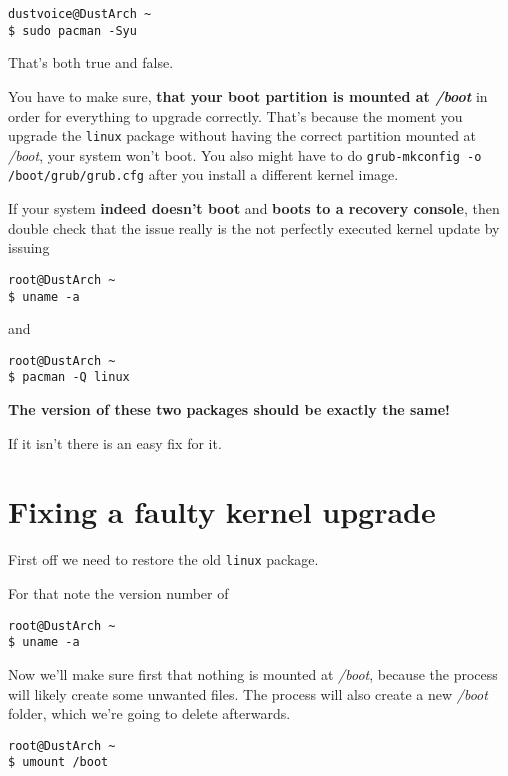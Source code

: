 \documentclass[10pt]{dustdoc}
\begin{document}
\begin{verbatim}
dustvoice@DustArch ~
$ sudo pacman -Syu
\end{verbatim}

That’s both true and false.

You have to make sure, \textbf{that your boot partition is mounted at \textit{/boot}} in order for everything to upgrade correctly.
That’s because the moment you upgrade the \texttt{linux} package without having the correct partition mounted at \textit{/boot}, your system won’t boot.
You also might have to do \texttt{grub-mkconfig -o /boot/grub/grub.cfg} after you install a different kernel image.

If your system \textbf{indeed doesn’t boot} and \textbf{boots to a recovery console}, then double check that the issue really is the not perfectly executed kernel update by issuing

\begin{verbatim}
root@DustArch ~
$ uname -a
\end{verbatim}

\noindent
and

\begin{verbatim}
root@DustArch ~
$ pacman -Q linux
\end{verbatim}

\textbf{The version of these two packages should be exactly the same!}

If it isn’t there is an easy fix for it.

\section{Fixing a faulty kernel upgrade}
\label{sec:fixing-a-faulty-kernel-upgrade}

First off we need to restore the old \texttt{linux} package.

For that note the version number of

\begin{verbatim}
root@DustArch ~
$ uname -a
\end{verbatim}

Now we’ll make sure first that nothing is mounted at \textit{/boot}, because the process will likely create some unwanted files.
The process will also create a new \textit{/boot} folder, which we’re going to delete afterwards.

\begin{verbatim}
root@DustArch ~
$ umount /boot
\end{verbatim}
\end{document}
